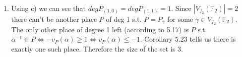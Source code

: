 \documentclass[12pt, a4paper]{article}
\begin{document}
\begin{enumerate}[label=(\alph*)]
\item Using c) we can see that $degP_{(1,0)} = degP_{(1,1)} = 1$. Since $|V_{f_2}(\mathbb{F}_2)|=2$ there can't be another place $P$ of deg 1 s.t. $P = P_\gamma$ for some $\gamma \in V_{f_2}(\mathbb{F}_2)$. The only other place of degree 1 left (according to 5.17) is $P$ s.t. $\alpha^{-1} \in P \iff -v_P(\alpha) \geq 1 \iff v_P(\alpha) \leq -1$. Corollary 5.23 tells us there is exactly one such place. Therefore the size of the set is 3.
\end{enumerate}
\end{document}

